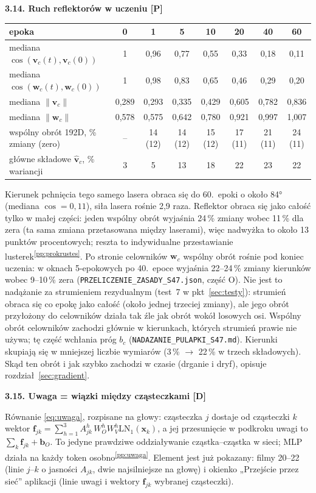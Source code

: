 \documentclass[a4paper,11pt]{article}
\newcommand{\stD}{\textcolor{dok}{\textsf{\textbf{[D]}}}}
\newcommand{\stP}{\textcolor{pom}{\textsf{\textbf{[P]}}}}
\newcommand{\LN}{\mathrm{LN}}
\newcommand{\pp}[1]{\textsuperscript{\ref{pp:#1}}}
\newcommand{\elem}[1]{\par\medskip\noindent\textbf{#1}\par\nopagebreak}
\begin{document}
\elem{3.14. Ruch reflektorów w uczeniu \stP}
\begin{center}\footnotesize
\begin{tabular}{>{\raggedright\arraybackslash}p{4.2cm}ccccccc}\toprule
epoka & 0 & 1 & 5 & 10 & 20 & 40 & 60\\\midrule
mediana $\cos(\bm v_c(t),\bm v_c(0))$ & 1 & 0,96 & 0,77 & 0,55 & 0,33 & 0,18 & 0,11\\
mediana $\cos(\bm w_c(t),\bm w_c(0))$ & 1 & 0,98 & 0,83 & 0,65 & 0,46 & 0,29 & 0,20\\
mediana $\lVert\bm v_c\rVert$ & 0,289 & 0,293 & 0,335 & 0,429 & 0,605 & 0,782 & 0,836\\
mediana $\lVert\bm w_c\rVert$ & 0,578 & 0,575 & 0,642 & 0,780 & 0,921 & 0,997 & 1,007\\
wspólny obrót 192D, \% zmiany (zero) & -- & 14 (12) & 14 (12) & 15 (12) & 17 (11) & 21 (11) & 24 (11)\\
3 główne składowe $\hat{\bm v}_c$, \% wariancji & 3 & 5 & 13 & 18 & 22 & 23 & 22\\\bottomrule
\end{tabular}
\end{center}
Kierunek pchnięcia tego samego lasera obraca się do 60.~epoki o około 84° (mediana $\cos=0{,}11$), siła lasera rośnie 2,9 raza.
Reflektor obraca się jako całość tylko w małej części: jeden wspólny obrót wyjaśnia 24\,\% zmiany wobec 11\,\% dla zera (ta sama zmiana
przetasowana między laserami), więc nadwyżka to około 13 punktów procentowych; reszta to indywidualne przestawianie lusterek\pp{prokrustes}.
Po stronie celowników $\bm w_c$ wspólny obrót rośnie pod koniec uczenia: w oknach 5-epokowych po 40.~epoce wyjaśnia 22--24\,\% zmiany
kierunków wobec 9--10\,\% zera (\texttt{PRZELICZENIE\_ZASADY\_S47.json}, część O). Nie jest to nadążanie za strumieniem rezydualnym
(test~7 w pkt~\ref{sec:testy}): strumień obraca się co epokę jako całość (około jednej trzeciej zmiany), ale jego obrót przyłożony do
celowników działa tak źle jak obrót wokół losowych osi. Wspólny obrót celowników zachodzi głównie w kierunkach, których strumień prawie
nie używa; tę część wchłania próg $b_c$ (\texttt{NADAZANIE\_PULAPKI\_S47.md}).
Kierunki skupiają się w mniejszej liczbie wymiarów (3\,\% $\to$ 22\,\% w trzech składowych).
Skąd ten obrót i jak szybko zachodzi w czasie (drganie i dryf), opisuje rozdział~\ref{sec:gradient}.

\elem{3.15. Uwaga = wiązki między cząsteczkami \stD}
Równanie \eqref{eq:uwaga}, rozpisane na głowy: cząsteczka $j$ dostaje od cząsteczki $k$ wektor
$\bm f_{jk}=\sum_{h=1}^{3}A^{h}_{jk}\,W_O^{h}W_V^{h}\LN_1(\bm x_k)$, a jej przesunięcie w podkroku uwagi to $\sum_k\bm f_{jk}+\bm b_O$.
To jedyne prawdziwe oddziaływanie cząstka--cząstka w sieci; MLP działa na każdy token osobno\pp{uwaga}. Element jest już pokazany:
filmy 20--22 (linie $j$--$k$ o jasności $A_{jk}$, dwie najsilniejsze na głowę) i okienko „Przejście przez sieć” aplikacji (linie
uwagi i wektory $\bm f_{jk}$ wybranej cząsteczki).
\end{document}
